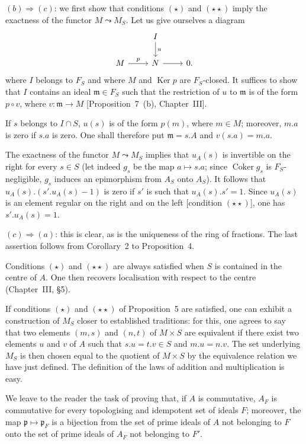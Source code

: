 $(b)\Rightarrow(c)$: we first show that conditions $(\star)$ and
$(\star\star)$ imply the exactness of the functor $M\leadsto M_S$. Let
us give ourselves a diagram
\[
\begin{tikzcd}
& I \arrow[d, "u"] \\
M \arrow[r, "p"] & N \arrow[r] & 0.
\end{tikzcd}
\]
where $I$ belongs to $F_S$ and where $M$ and $\operatorname{Ker}p$ are
$F_S$-closed. It suffices to show that $I$ contains an ideal
$\mathfrak{m}\in F_S$ such that the restriction of $u$ to
$\mathfrak{m}$ is of the form $p\circ v$, where $v:\mathfrak{m}\to M$
[Proposition~7~(b), Chapter~III].

If $s$ belongs to $I\cap S$, $u(s)$ is of the form $p(m)$, where
$m\in M$; moreover, $m.a$ is zero if $s.a$ is zero. One shall therefore
put $\mathfrak{m}=s.A$ and $v(s.a)=m.a$.

The exactness of the functor $M\leadsto M_S$ implies that $u_A(s)$ is
invertible on the right for every $s\in S$ (let indeed $g_s$ be the map
$a\mapsto s.a$; since $\operatorname{Coker}g_s$ is $F_S$-negligible,
$g_s$ induces an epimorphism from $A_S$ onto $A_S$). It follows that
$u_A(s).(s'.u_A(s)-1)$ is zero if $s'$ is such that
$u_A(s).s'=1$. Since $u_A(s)$ is an element regular on the right and on
the left [condition $(\star\star)$], one has $s'.u_A(s)=1$.

$(c)\Rightarrow(a)$: this is clear, as is the uniqueness of the ring of
fractions. The last assertion follows from Corollary~2 to
Proposition~4.

\begin{remark}
Conditions $(\star)$ and $(\star\star)$ are always satisfied when $S$ is
contained in the centre of $A$. One then recovers localisation with
respect to the centre (Chapter~III, \S5).
\end{remark}

\begin{remark}
If conditions $(\star)$ and $(\star\star)$ of Proposition~5 are
satisfied, one can exhibit a construction of $M_S$ closer to
established traditions: for this, one agrees to say that two elements
$(m,s)$ and $(n,t)$ of $M\times S$ are equivalent if there exist two
elements $u$ and $v$ of $A$ such that $s.u=t.v\in S$ and $m.u=n.v$.
The set underlying $M_S$ is then chosen equal to the quotient of
$M\times S$ by the equivalence relation we have just defined. The
definition of the laws of addition and multiplication is easy.
\end{remark}

\begin{remark}
We leave to the reader the task of proving that, if $A$ is commutative,
$A_F$ is commutative for every topologising and idempotent set of ideals
$F$; moreover, the map $\mathfrak{p}\mapsto\mathfrak{p}_F$ is a
bijection from the set of prime ideals of $A$ not belonging to $F$ onto
the set of prime ideals of $A_F$ not belonging to $F'$.
\end{remark}
